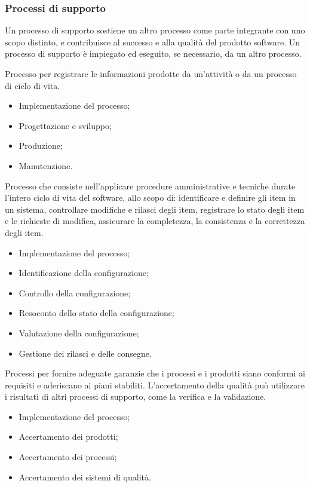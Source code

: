 \subsubsection{Processi di supporto}
Un processo di supporto sostiene un altro processo come parte integrante 
con uno scopo distinto, e contribuisce al successo e alla qualità del prodotto software. 
Un processo di supporto è impiegato ed eseguito, se necessario, da un altro processo. 

Processo per registrare le informazioni prodotte da un'attività o
da un processo di ciclo di vita.
\begin{itemize}
    \item Implementazione del processo;
    \item Progettazione e sviluppo;
    \item Produzione;
    \item Manutenzione.
\end{itemize}

Processo che consiste nell'applicare procedure amministrative e tecniche
durate l'intero ciclo di vita del software, allo scopo di: identificare e definire
gli item in un sistema, controllare modifiche e rilasci degli item,
registrare lo stato degli item e le richieste di modifica, assicurare la completezza,
la consistenza e la correttezza degli item.
\begin{itemize}
    \item Implementazione del processo;
    \item Identificazione della configurazione;
    \item Controllo della configurazione;
    \item Resoconto dello stato della configurazione;
    \item Valutazione della configurazione;
    \item Gestione dei rilasci e delle consegne.
\end{itemize}

Processi per fornire adeguate garanzie che i processi e i prodotti
siano conformi ai requisiti e aderiscano ai piani stabiliti.
L'accertamento della qualità può utilizzare i risultati di altri
processi di supporto, come la verifica e la validazione.
\begin{itemize}
    \item Implementazione del processo;
    \item Accertamento dei prodotti;
    \item Accertamento dei processi;
    \item Accertamento dei sistemi di qualità.
\end{itemize}

